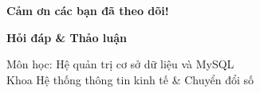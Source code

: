 \documentclass[aspectratio=169,11pt]{beamer}
\begin{document}
\begin{frame}
  \centering
  \vspace{1.5cm}
  {\Huge\textcolor{dbblue}{\textbf{Cảm ơn các bạn đã theo dõi!}}}
  
  \vspace{0.8cm}
  {\large\textbf{Hỏi đáp \& Thảo luận}}
  
  \vspace{1.2cm}
  {\footnotesize Môn học: Hệ quản trị cơ sở dữ liệu và MySQL\\Khoa Hệ thống thông tin kinh tế \& Chuyển đổi số}
\end{frame}
\end{document}

